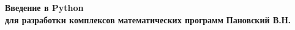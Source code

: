 \documentclass[10pt]{book}
\begin{document}
\begin{titlepage}
\begin{center}
\begin{spacing}{2.5}
{\huge\bfseries Введение в Python \\ для разработки комплексов математических программ}
{\Large\bfseries Пановский В.Н.}\\[5pt]
\end{spacing}
\end{center}
\end{titlepage}

\tableofcontents{}






\end{document}
